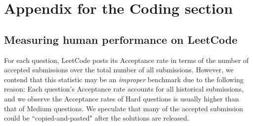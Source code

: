 \section{Appendix for the Coding section}
\label{sec:code_appendix}
\subsection{Measuring human performance on LeetCode}
\label{sec:leetcode-human}
For each question, LeetCode posts its Acceptance rate in terms of the number of accepted submissions over the total number of all submissions. However, we contend that this statistic may be an \emph{improper} benchmark due to the following reason: Each question's Acceptance rate accounts for all historical submissions, and we observe the Acceptance rates of Hard questions is usually higher than that of Medium questions. We speculate that many of the accepted submission could be ``copied-and-pasted" after the solutions are released.
    \item 
